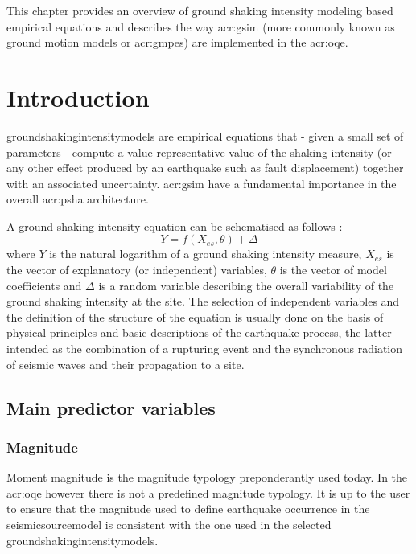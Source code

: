 This chapter provides an overview of ground shaking intensity modeling based 
empirical equations and describes the way \gls{acr:gsim} (more commonly 
known as ground motion models or \glspl{acr:gmpe}) are implemented in the 
\gls{acr:oqe}.
%
\section{Introduction}
%
\glspl{groundshakingintensitymodel} are empirical equations that - given a 
small set of parameters 
- compute a value representative value of the shaking intensity (or any other 
effect produced by an earthquake such as fault displacement) together with 
an associated uncertainty. 
%
\gls{acr:gsim} have a fundamental importance in the overall \gls{acr:psha} 
architecture.

A ground shaking intensity equation can be schematised as follows 
\parencite{alatik2010}: 
\begin{equation}
Y = f(X_{es},\theta)+\Delta
\end{equation}
where $Y$ is the natural logarithm of a ground shaking intensity measure, 
$X_{es}$ is the vector of explanatory (or independent) variables, $\theta$ 
is the vector of model coefficients and $\Delta$ is a random variable 
describing the overall variability of the ground shaking intensity at 
the site.
%
The selection of independent variables and the definition of the structure 
of the equation is usually done on the basis of physical principles and 
basic descriptions of the earthquake process, the latter
intended as the combination of a rupturing event and the synchronous 
radiation of seismic waves and their propagation to a site.
%
\subsection{Main predictor variables}
%
\subsubsection{Magnitude}
Moment magnitude \parencite{hanks1979} is the magnitude typology 
preponderantly used today. 
%
In the \gls{acr:oqe} however there is not a predefined magnitude typology.
It is up to the user to ensure that the magnitude used to define earthquake 
occurrence in the \gls{seismicsourcemodel} is consistent with the one used 
in the selected \glspl{groundshakingintensitymodel}.
%
%
